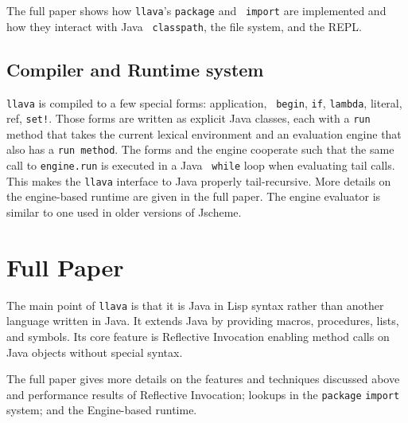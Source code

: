 \documentclass{acm-final/sig-alternate-modified}
\begin{document}

The full paper shows how {\tt llava}'s {\tt package} and {\tt
import} are implemented and how they interact with Java {\tt
classpath}, the file system, and the REPL.


\subsection{Compiler and Runtime system}

{\tt llava} is compiled to a few special forms: application, {\tt
begin}, {\tt if}, {\tt lambda}, literal, ref, {\tt set!}.  Those forms
are written as explicit Java classes, each with a {\tt run} method
that takes the current lexical environment and an evaluation engine
that also has a {\tt run method}.  The forms and the engine cooperate
such that the same call to {\tt engine.run} is executed in a Java {\tt
while} loop when evaluating tail calls.  This makes the {\tt llava}
interface to Java properly tail-recursive.  More details on the
engine-based runtime are given in the full paper.  The engine
evaluator is similar to one used in older versions of Jscheme.

\section{Full Paper}

The main point of {\tt llava} is that it is Java in Lisp syntax rather
than another language written in Java.  It extends Java by providing
macros, procedures, lists, and symbols.  Its core feature is Reflective
Invocation enabling method calls on Java objects without special
syntax.

The full paper gives more details on the features and techniques
discussed above and performance results of Reflective Invocation;
lookups in the {\tt package} {\tt import} system; and the Engine-based
runtime.
\end{document}
